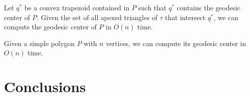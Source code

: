 \documentclass[a4paper,UKenglish]{lipics}
\begin{document}
\begin{theorem}
Let $q^*$ be a convex trapezoid contained in $P$ such that $q^*$ contains the geodesic center of $P$. Given the set of all apexed triangles of $\tau$ that intersect $q^*$, we can compute the geodesic center of $P$ in $O(n)$ time.
\end{theorem}

\begin{corollary}
Given a simple polygon $P$ with $n$ vertices, we can compute its geodesic center in $O(n)$ time.
\end{corollary}

\section{Conclusions}



\end{document}
